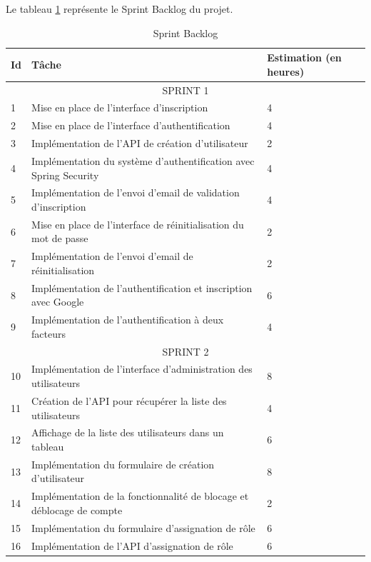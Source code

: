 \documentclass[12pt]{report}
\begin{document}
				Le tableau \ref{tab:SprintBacklog} représente le Sprint Backlog du projet.


				\begin{longtable}{|p{1cm}|p{7cm}|p{6cm}|} 
						\caption{Sprint Backlog} 
						\label{tab:SprintBacklog}\\ 
						\hline 
						\textbf{Id} & \textbf{Tâche} & \textbf{Estimation (en heures)} \\ 
						\hline 
						\endfirsthead 	
						\endhead
						\multicolumn{3}{|c|}{SPRINT 1}\\
						\hline
						1 & Mise en place de l'interface d'inscription & 4\\
						\hline
						2 & Mise en place de l'interface d'authentification & 4 \\
						\hline
						3 & Implémentation de l'API de création d'utilisateur & 2\\
						\hline
						4 & Implémentation du système d'authentification avec Spring Security & 4\\
						\hline
						5 & Implémentation de l'envoi d'email de validation d'inscription & 4\\
						\hline
						6 & Mise en place de l'interface de réinitialisation du mot de passe & 2\\
						\hline
						7 & Implémentation de l'envoi d'email de réinitialisation & 2\\
						\hline
						8 & Implémentation de l'authentification et inscription avec Google & 6\\
						\hline
						9 & Implémentation de l'authentification à deux facteurs & 4 \\
						\hline
						\multicolumn{3}{|c|}{SPRINT 2}\\
						\hline
						10 & Implémentation de l'interface d'administration des utilisateurs & 8\\
						\hline
						11 & Création de l'API pour récupérer la liste des utilisateurs & 4\\
						\hline
						12 & Affichage de la liste des utilisateurs dans un tableau & 6\\
						\hline
						13 & Implémentation du formulaire de création d'utilisateur & 8\\
						\hline
						14 & Implémentation de la fonctionnalité de blocage et déblocage de compte & 2\\
						\hline
						15 & Implémentation du formulaire d'assignation de rôle & 6\\
						\hline
						16 & Implémentation de l'API d'assignation de rôle & 6\\

\end{longtable}
\end{document}
